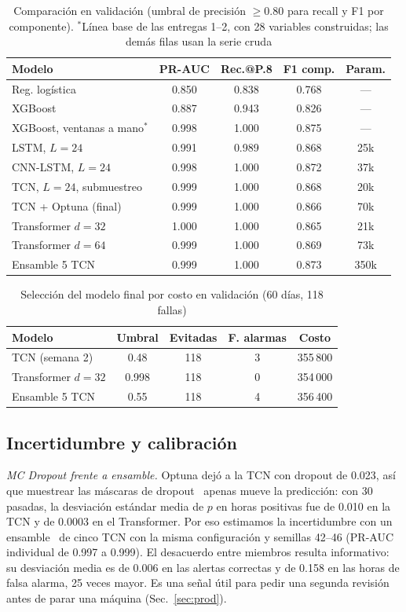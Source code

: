 \documentclass[conference,letterpaper]{IEEEtran}
\begin{document}
\begin{table}[t]
\centering
\caption{Comparación en validación (umbral de precisión $\ge 0.80$ para recall y F1 por componente). $^*$Línea base de las entregas 1--2, con 28 variables construidas; las demás filas usan la serie cruda}
\label{tab:val}
\setlength{\tabcolsep}{3pt}\footnotesize
\begin{tabular}{lcccc}
\toprule
Modelo & PR-AUC & Rec.@P.8 & F1 comp. & Param. \\
\midrule
Reg. logística & 0.850 & 0.838 & 0.768 & --- \\
XGBoost & 0.887 & 0.943 & 0.826 & --- \\
XGBoost, ventanas a mano$^*$ & 0.998 & 1.000 & 0.875 & --- \\
LSTM, $L=24$ & 0.991 & 0.989 & 0.868 & 25k \\
CNN-LSTM, $L=24$ & 0.998 & 1.000 & 0.872 & 37k \\
TCN, $L=24$, submuestreo & 0.999 & 1.000 & 0.868 & 20k \\
TCN + Optuna (final) & 0.999 & 1.000 & 0.866 & 70k \\
Transformer $d=32$ & 1.000 & 1.000 & 0.865 & 21k \\
Transformer $d=64$ & 0.999 & 1.000 & 0.869 & 73k \\
Ensamble 5 TCN & 0.999 & 1.000 & 0.873 & 350k \\
\bottomrule
\end{tabular}
\end{table}

\begin{table}[t]
\centering
\caption{Selección del modelo final por costo en validación (60 días, 118 fallas)}
\label{tab:sel}
\begin{tabular}{lcccc}
\toprule
Modelo & Umbral & Evitadas & F. alarmas & Costo \\
\midrule
TCN (semana 2) & 0.48 & 118 & 3 & 355\,800 \\
Transformer $d=32$ & 0.998 & 118 & 0 & 354\,000 \\
Ensamble 5 TCN & 0.55 & 118 & 4 & 356\,400 \\
\bottomrule
\end{tabular}
\end{table}

\subsection{Incertidumbre y calibración}
\textit{MC Dropout frente a ensamble.} Optuna dejó a la TCN con dropout de 0.023, así que muestrear las máscaras de dropout~\cite{gal} apenas mueve la predicción: con 30 pasadas, la desviación estándar media de $p$ en horas positivas fue de 0.010 en la TCN y de 0.0003 en el Transformer. Por eso estimamos la incertidumbre con un ensamble~\cite{lakshmi} de cinco TCN con la misma configuración y semillas 42--46 (PR-AUC individual de 0.997 a 0.999). El desacuerdo entre miembros resulta informativo: su desviación media es de 0.006 en las alertas correctas y de 0.158 en las horas de falsa alarma, 25 veces mayor. Es una señal útil para pedir una segunda revisión antes de parar una máquina (Sec.~\ref{sec:prod}).
\end{document}

